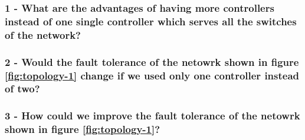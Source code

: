 \subsubsection*{1 - What are the advantages of having more controllers instead of one
single controller which serves all the switches of the network?}
\hrulefill

\hrulefill

\hrulefill

\hrulefill

\subsubsection*{2 - Would the fault tolerance of the netowrk shown in figure
\ref{fig:topology-1} change if we used only one controller instead of two?}
\hrulefill

\hrulefill

\hrulefill

\hrulefill

\subsubsection*{3 - How could we improve the fault tolerance of the netowrk shown
in figure \ref{fig:topology-1}?} %
\hrulefill

\hrulefill

\hrulefill

\hrulefill


